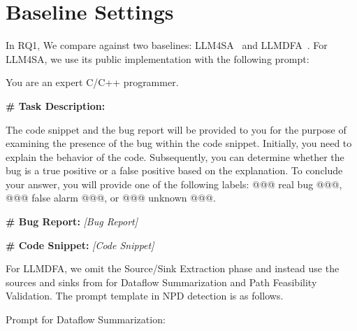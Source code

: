 \section{Baseline Settings}
\label{ap:baseline}

In RQ1, We compare \app{} against two baselines: LLM4SA~\cite{llm4sa} and LLMDFA~\cite{llmdfa}. 
For LLM4SA, we use its public implementation with the following prompt:

\begin{mdframed}
[linecolor=myblue!50,linewidth=2pt,roundcorner=10pt,backgroundcolor=myyellow!20]
\small

\hspace{3.5mm} You are an expert C/C++ programmer.

\textbf{\# Task Description:} 

The code snippet and the bug report will be provided to you for the purpose of examining the presence of the bug within the code snippet. Initially, you need to explain the behavior of the code. Subsequently, you can determine whether the bug is a true positive or a false positive based on the explanation.  To conclude your answer, you will provide one of the following labels: @@@ real bug @@@, @@@ false alarm @@@, or @@@ unknown @@@.

\textbf{\# Bug Report:} \textit{[Bug Report]}

\textbf{\# Code Snippet:} \textit{[Code Snippet]}


\end{mdframed}

For LLMDFA, we omit the Source/Sink Extraction phase and instead use the sources and sinks from \ourbench{} for Dataflow Summarization and Path Feasibility Validation. The prompt template in NPD detection is as follows.

Prompt for Dataflow Summarization:

